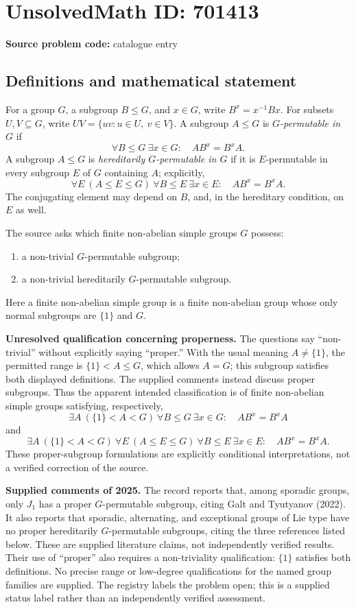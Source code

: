 \documentclass[11pt]{article}
\begin{document}
\section*{UnsolvedMath ID: 701413}
\textbf{Source problem code:} catalogue entry
\subsection{Definitions and mathematical statement}
For a group \(G\), a subgroup \(B\leq G\), and \(x\in G\), write \(B^x=x^{-1}Bx\). For subsets \(U,V\subseteq G\), write \(UV=\{uv:u\in U,\ v\in V\}\). A subgroup \(A\leq G\) is \emph{\(G\)-permutable in \(G\)} if
\[
\forall B\leq G\ \exists x\in G:\quad AB^x=B^xA.
\]
A subgroup \(A\leq G\) is \emph{hereditarily \(G\)-permutable in \(G\)} if it is \(E\)-permutable in every subgroup \(E\) of \(G\) containing \(A\); explicitly,
\[
\forall E\ (A\leq E\leq G)\ \forall B\leq E\ \exists x\in E:\quad AB^x=B^xA.
\]
The conjugating element may depend on \(B\), and, in the hereditary condition, on \(E\) as well.

The source asks which finite non-abelian simple groups \(G\) possess:
\begin{enumerate}
\item a non-trivial \(G\)-permutable subgroup;
\item a non-trivial hereditarily \(G\)-permutable subgroup.
\end{enumerate}
Here a finite non-abelian simple group is a finite non-abelian group whose only normal subgroups are \(\{1\}\) and \(G\).

\textbf{Unresolved qualification concerning properness.} The questions say ``non-trivial'' without explicitly saying ``proper.'' With the usual meaning \(A\neq\{1\}\), the permitted range is \(\{1\}<A\leq G\), which allows \(A=G\); this subgroup satisfies both displayed definitions. The supplied comments instead discuss proper subgroups. Thus the apparent intended classification is of finite non-abelian simple groups satisfying, respectively,
\[
\exists A\ (\{1\}<A<G)\ \forall B\leq G\ \exists x\in G:\quad AB^x=B^xA
\]
and
\[
\exists A\ (\{1\}<A<G)\ \forall E\ (A\leq E\leq G)\ \forall B\leq E\ \exists x\in E:\quad AB^x=B^xA.
\]
These proper-subgroup formulations are explicitly conditional interpretations, not a verified correction of the source.

\textbf{Supplied comments of 2025.} The record reports that, among sporadic groups, only \(J_1\) has a proper \(G\)-permutable subgroup, citing Galt and Tyutyanov (2022). It also reports that sporadic, alternating, and exceptional groups of Lie type have no proper hereditarily \(G\)-permutable subgroups, citing the three references listed below. These are supplied literature claims, not independently verified results. Their use of ``proper'' also requires a non-triviality qualification: \(\{1\}\) satisfies both definitions. No precise range or low-degree qualifications for the named group families are supplied. The registry labels the problem open; this is a supplied status label rather than an independently verified assessment.
\end{document}
